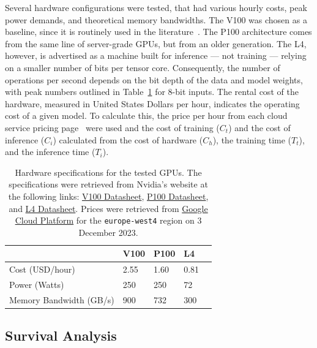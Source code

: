 \documentclass[sn-mathphys-num]{sn-jnl}%
\begin{document}
Several hardware configurations were tested, that had various hourly costs, peak power demands, and theoretical memory bandwidths. The V100 was chosen as a baseline, since it is routinely used in the literature~\cite{svedin2021benchmarking,xu2018deep}. The P100 architecture comes from the same line of server-grade GPUs, but from an older generation. The L4, however, is advertised as a machine built for inference --- not training --- relying on a smaller number of bits per tensor core. Consequently, the number of operations per second depends on the bit depth of the data and model weights, with peak numbers outlined in Table~\ref{tab:hardware} for 8-bit inputs. The rental cost of the hardware, measured in United States Dollars per hour, indicates the operating cost of a given model. To calculate this, the price per hour from each cloud service pricing page~\cite{pricing_1,pricing_2} were used and the cost of training ($C_{t}$) and the cost of inference ($C_{i}$) calculated from the cost of hardware ($C_{h}$), the training time ($T_{t}$), and the inference time ($T_{i}$).
\begin{table}[h]
    \centering
    \begin{tabular}{lllll}
    \toprule
                            & V100   & P100   & L4    &  \\
    \midrule
    Cost (USD/hour)         & 2.55   & 1.60   & 0.81   &  \\
    Power (Watts)           & 250    & 250    & 72    &  \\
    Memory Bandwidth (GB/s) & 900    & 732    & 300   &  \\
    \bottomrule
    \end{tabular}
    \caption{Hardware specifications for the tested GPUs. The specifications were retrieved from Nvidia's website at the following links:
    \href{https://images.nvidia.com/content/technologies/volta/pdf/volta-v100-datasheet-update-us-1165301-r5.pdf}{V100 Datasheet},
    \href{https://images.nvidia.com/content/tesla/pdf/nvidia-tesla-p100-PCIe-datasheet.pdf}{P100 Datasheet}, and
    \href{https://nvdam.widen.net/s/rvq98gbwsw/l4-datasheet-2595652}{L4 Datasheet}. Prices were retrieved from \href{https://cloud.google.com/pricing/list}{Google Cloud Platform} for the \texttt{europe-west4} region on 3 December 2023.
    }
    \label{tab:hardware}
\end{table}


\subsection{Survival Analysis}
\end{document}

